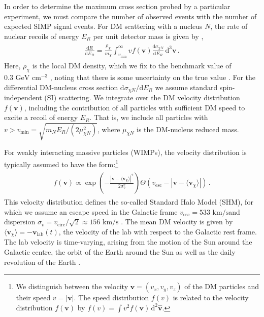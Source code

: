 \documentclass[prd,twocolumn,showpacs,nofootinbib,aps]{revtex4-1}
\newcommand{\vmin}{v_\mathrm{min}}
\newcommand{\dbd}[2]{\frac{\mathrm{d}#1}{\mathrm{d}#2}}
\begin{document}
In order to determine the maximum cross section probed by a particular experiment, we must compare the number of observed events with the number of expected SIMP signal events. For DM scattering with a nucleus $N$, the rate of nuclear recoils of energy $E_R$ per unit detector mass is given by \cite{Jungman:1995df},
\begin{align}
\begin{split}
\label{eq:dRdE}
\frac{\mathrm{d}R}{\mathrm{d}E_R} = \frac{\rho_\chi}{m_\chi}   \int_{\vmin}^\infty v f(\mathbf{v}) \dbd{\sigma_{\chi N}}{E_R} \, \mathrm{d}^3\mathbf{v}\,.
\end{split}
\end{align}
Here, $\rho_\chi$ is the local DM density, which we fix to the benchmark value of $0.3\,\,\mathrm{GeV} \,\,\mathrm{cm}^{-3}$ \cite{Green:2011bv}, noting that there is some uncertainty on the true value \cite{Read:2014qva}. For the differential DM-nucleus cross section $\mathrm{d}\sigma_{\chi N}/\mathrm{d}E_R$ we assume standard spin-independent (SI) scattering. We integrate over the DM velocity distribution $f(\mathbf{v})$, including the contribution of all particles with sufficient DM speed to excite a recoil of energy $E_R$. That is, we include all particles with $v > v_\mathrm{min} = \sqrt{m_N E_R/(2 \mu_{\chi N}^2)}$, where $\mu_{\chi N}$ is the DM-nucleus reduced mass. 


For weakly interacting massive particles (WIMPs), the velocity distribution is typically assumed to have the form:\footnote{We distinguish between the velocity $\mathbf{v} = (v_x, v_y, v_z)$ of the DM particles and their speed $v = |\mathbf{v}|$. The speed distribution $f(v)$ is related to the velocity distribution $f(\mathbf{v})$ by $f(v) = \int v^2 f(\mathbf{v}) \,\mathrm{d}^2\hat{\mathbf{v}}$.}
\begin{align}
\begin{split}
\label{eq:veldist}
f(\mathbf{v}) \propto \exp\left(-\frac{\left|\mathbf{v} - \langle \mathbf{v}_\chi \rangle\right|^2}{2 \sigma_v^2}\right) \Theta(v_\mathrm{esc} - \left|\mathbf{v} - \langle\mathbf{v}_\chi\rangle\right|)\,.
\end{split}
\end{align}
This velocity distribution defines the so-called Standard Halo Model (SHM), for which we assume an escape speed in the Galactic frame $v_\mathrm{esc} = 533 \,\,\mathrm{km/s}$and dispersion $\sigma_v = v_\mathrm{circ}/\sqrt{2} \approx 156 \,\, \mathrm{km/s}$ \cite{Green:2011bv}. The mean DM velocity is given by $\langle \mathbf{v}_\chi \rangle = - \mathbf{v}_\mathrm{lab}(t)$, the velocity of the lab with respect to the Galactic rest frame. The lab velocity is time-varying, arising from the motion of the Sun around the Galactic centre, the orbit of the Earth around the Sun as well as the daily revolution of the Earth \cite{Bozorgnia:2011tk,Mayet:2016zxu}. 
\end{document}
